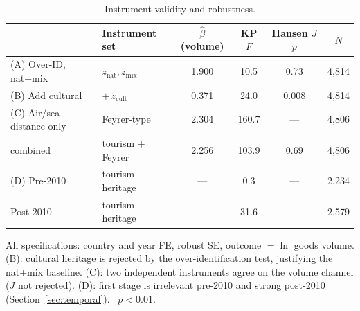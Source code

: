\begin{table}[H]
\centering
\caption{Instrument validity and robustness.}
\label{tab:robust}
\begin{threeparttable}
\small
\begin{tabular}{llcccc}
\toprule
 & Instrument set & $\hat\beta$ (volume) & KP $F$ & Hansen $J$ $p$ & $N$ \\
\midrule
(A) Over-ID, nat+mix      & $z_{\text{nat}},z_{\text{mix}}$ & 1.900\sym{***} & 10.5 & 0.73 & 4{,}814 \\
(B) Add cultural          & $+\,z_{\text{cult}}$            & 0.371          & 24.0 & 0.008 & 4{,}814 \\
(C) Air/sea distance only & Feyrer-type                     & 2.304\sym{***} & 160.7 & --- & 4{,}806 \\
\quad combined            & tourism $+$ Feyrer              & 2.256\sym{***} & 103.9 & 0.69 & 4{,}806 \\
(D) Pre-2010              & tourism-heritage                & ---            & 0.3 & --- & 2{,}234 \\
\quad Post-2010           & tourism-heritage                & ---            & 31.6 & --- & 2{,}579 \\
\bottomrule
\end{tabular}
\begin{tablenotes}\small
\item All specifications: country and year FE, robust SE, outcome $=\ln$ goods
volume. (B): cultural heritage is rejected by the over-identification test,
justifying the nat+mix baseline. (C): two independent instruments agree on the
volume channel ($J$ not rejected). (D): first stage is irrelevant pre-2010 and
strong post-2010 (Section~\ref{sec:temporal}).
\sym{***}~$p<0.01$.
\end{tablenotes}
\end{threeparttable}
\end{table}

